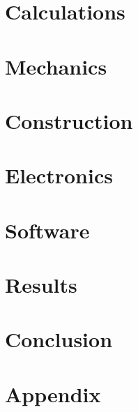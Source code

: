 \documentclass[11pt,openany, english]{book}
\newcommand{\cfbox}[2]{%
    \colorlet{currentcolor}{.}%
    {\color{#1}%
    \noindent\fbox{\vbox{\hsize\dimexpr\hsize-2\fboxsep\relax
    #2
    }}}%
}
\newcommand{\todo}[1]{\begin{center}\cfbox{red}{\textcolor{red}{Todo: #1}}\end{center}}
\newcommand{\footl}{\Chaptername}
\begin{document}
    \chapter{Calculations}\label{ch:calculations}
    


    \chapter{Mechanics}\label{ch:mechanics}
    


    \chapter{Construction}\label{ch:construction}
    


    \chapter{Electronics}\label{ch:electronics}
    


    \chapter{Software}\label{ch:software}
    


    \chapter{Results}\label{ch:results}
    


    \chapter{Conclusion}\label{ch:conclusion}
    

    \newpage
    \renewcommand{\footl}{References}

    
    \printbibliography

%    

    \newpage


    \chapter{Appendix}\label{ch:appendix}
    \renewcommand{\footl}{\Chaptername}
    
\end{document}

